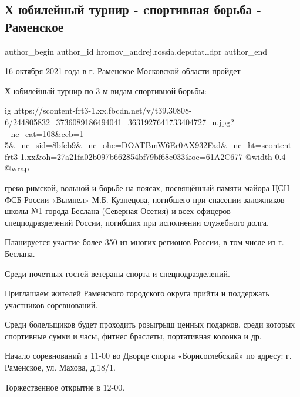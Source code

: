  
 
 
 
 
 
\subsection{Х юбилейный турнир - cпортивная борьба - Раменское}
\label{sec:12_10_2021.fb.hromov_andrej.rossia.deputat.ldpr.1.ramenskoje_turnir_borjba}
 
\ifcmt
 author_begin
   author_id hromov_andrej.rossia.deputat.ldpr
 author_end
\fi

16 октября 2021 года в г. Раменское Московской области пройдет 

Х юбилейный турнир по 3-м видам спортивной борьбы: 

\ifcmt
  ig https://scontent-frt3-1.xx.fbcdn.net/v/t39.30808-6/244805832_3736089186494041_3631927641733404727_n.jpg?_nc_cat=108&ccb=1-5&_nc_sid=8bfeb9&_nc_ohc=DOATBmW6Er0AX932Fad&_nc_ht=scontent-frt3-1.xx&oh=27a21fa02b097b662854bf79bf68c033&oe=61A2C677
  @width 0.4
  @wrap 
\fi

греко-римской, вольной и борьбе на поясах, посвящённый памяти майора ЦСН ФСБ
России «Вымпел» М.Б. Кузнецова, погибшего при спасении заложников школы №1
города Беслана (Северная Осетия) и всех офицеров спецподразделений России,
погибших при исполнении служебного долга. 

Планируется участие более 350 из многих регионов России, в том числе из г.
Беслана. 

Среди почетных гостей ветераны спорта и спецподразделений. 

Приглашаем жителей Раменского городского округа прийти и поддержать участников
соревнований. 

Среди болельщиков будет проходить розыгрыш ценных подарков, среди которых
спортивные сумки и часы, фитнес браслеты, портативная колонка и др.

Начало соревнований в 11-00 во Дворце спорта «Борисоглебский» по адресу: г.
Раменское, ул. Махова, д.18/1.

Торжественное открытие в 12-00.
